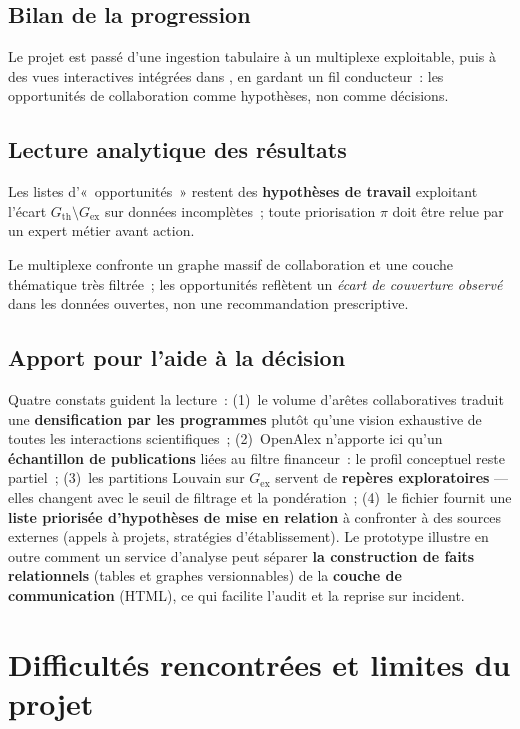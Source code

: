 \documentclass[12pt,a4paper,oneside]{article}
\begin{document}
\subsection{Bilan de la progression}
Le projet est passé d'une ingestion tabulaire à un multiplexe exploitable, puis à des vues interactives intégrées dans , en gardant un fil conducteur~: les opportunités de collaboration comme hypothèses, non comme décisions.

\subsection{Lecture analytique des résultats}
\begin{alertbox}
Les listes d'«~opportunités~» restent des \textbf{hypothèses de travail} exploitant l'écart $G_{\mathrm{th}} \setminus G_{\mathrm{ex}}$ sur données incomplètes~; toute priorisation $\pi$ doit être relue par un expert métier avant action.
\end{alertbox}

Le multiplexe confronte un graphe massif de collaboration et une couche thématique très filtrée~; les opportunités reflètent un \emph{écart de couverture observé} dans les données ouvertes, non une recommandation prescriptive.


\subsection{Apport pour l'aide à la décision}
Quatre constats guident la lecture~: (1)~le volume d'arêtes collaboratives traduit une \textbf{densification par les programmes} plutôt qu'une vision exhaustive de toutes les interactions scientifiques~; (2)~OpenAlex n'apporte ici qu'un \textbf{échantillon de publications} liées au filtre financeur~: le profil conceptuel reste partiel~; (3)~les partitions Louvain sur $G_{\mathrm{ex}}$ servent de \textbf{repères exploratoires} — elles changent avec le seuil de filtrage et la pondération~; (4)~le fichier  fournit une \textbf{liste priorisée d'hypothèses de mise en relation} à confronter à des sources externes (appels à projets, stratégies d'établissement). Le prototype illustre en outre comment un service d'analyse peut séparer \textbf{la construction de faits relationnels} (tables et graphes versionnables) de la \textbf{couche de communication} (HTML), ce qui facilite l'audit et la reprise sur incident.


\section{Difficultés rencontrées et limites du projet}
\end{document}
